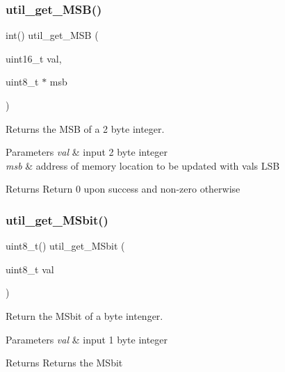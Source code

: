 \subsubsection{\texorpdfstring{util\+\_\+get\+\_\+\+M\+S\+B()}{util\_get\_MSB()}}
{\footnotesize\ttfamily int() util\+\_\+get\+\_\+\+M\+SB (\begin{DoxyParamCaption}\item[{uint16\+\_\+t}]{val,  }\item[{uint8\+\_\+t $\ast$}]{msb }\end{DoxyParamCaption})}



Returns the M\+SB of a 2 byte integer. 


\begin{DoxyParams}{Parameters}
{\em val} & input 2 byte integer \\
\hline
{\em msb} & address of memory location to be updated with val\textquotesingle{}s L\+SB \\
\hline
\end{DoxyParams}
\begin{DoxyReturn}{Returns}
Return 0 upon success and non-\/zero otherwise 
\end{DoxyReturn}
\mbox{\label{group__utils_gaca4b22ad3b1f07c438b1a6fc3ac1052c}} 
\subsubsection{\texorpdfstring{util\+\_\+get\+\_\+\+M\+Sbit()}{util\_get\_MSbit()}}
{\footnotesize\ttfamily uint8\+\_\+t() util\+\_\+get\+\_\+\+M\+Sbit (\begin{DoxyParamCaption}\item[{uint8\+\_\+t}]{val }\end{DoxyParamCaption})}



Return the M\+Sbit of a byte intenger. 


\begin{DoxyParams}{Parameters}
{\em val} & input 1 byte integer \\
\hline
\end{DoxyParams}
\begin{DoxyReturn}{Returns}
Returns the M\+Sbit 
\end{DoxyReturn}
\mbox{\label{group__utils_ga79a031a8611f5b2d6afa4158e92b0fb4}} 
